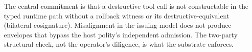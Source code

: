 The central commitment is that a destructive tool call is not constructable in the typed runtime path without a rollback witness or its destructive-equivalent (bilateral cosignature). Misalignment in the issuing model does not produce envelopes that bypass the host polity's independent admission. The two-party structural check, not the operator's diligence, is what the substrate enforces.
